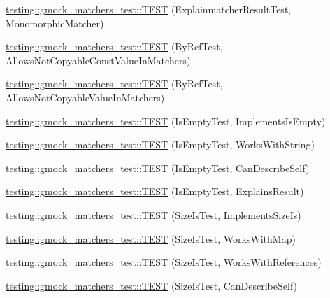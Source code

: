 \begin{DoxyCompactItemize}
\item 
\hyperlink{namespacetesting_1_1gmock__matchers__test_a102b10d9064f6e0037e3f3f0c3e76e22}{testing\+::gmock\+\_\+matchers\+\_\+test\+::\+T\+E\+ST} (Explainmatcher\+Result\+Test, Monomorphic\+Matcher)
\item 
\hyperlink{namespacetesting_1_1gmock__matchers__test_aab82f120c70dc7d8bc2fd74ac6897486}{testing\+::gmock\+\_\+matchers\+\_\+test\+::\+T\+E\+ST} (By\+Ref\+Test, Allows\+Not\+Copyable\+Const\+Value\+In\+Matchers)
\item 
\hyperlink{namespacetesting_1_1gmock__matchers__test_a5ed7b822889a34f018c2ba8f21941fd4}{testing\+::gmock\+\_\+matchers\+\_\+test\+::\+T\+E\+ST} (By\+Ref\+Test, Allows\+Not\+Copyable\+Value\+In\+Matchers)
\item 
\hyperlink{namespacetesting_1_1gmock__matchers__test_ab63796f77c7572f6f1aef01cb140f99e}{testing\+::gmock\+\_\+matchers\+\_\+test\+::\+T\+E\+ST} (Is\+Empty\+Test, Implements\+Is\+Empty)
\item 
\hyperlink{namespacetesting_1_1gmock__matchers__test_a22f0cacccee169b7390741b9815f4281}{testing\+::gmock\+\_\+matchers\+\_\+test\+::\+T\+E\+ST} (Is\+Empty\+Test, Works\+With\+String)
\item 
\hyperlink{namespacetesting_1_1gmock__matchers__test_adcf3743190f973f2773296d0772e8950}{testing\+::gmock\+\_\+matchers\+\_\+test\+::\+T\+E\+ST} (Is\+Empty\+Test, Can\+Describe\+Self)
\item 
\hyperlink{namespacetesting_1_1gmock__matchers__test_a1c168c284000d05d63bf5e9df10d1b7c}{testing\+::gmock\+\_\+matchers\+\_\+test\+::\+T\+E\+ST} (Is\+Empty\+Test, Explains\+Result)
\item 
\hyperlink{namespacetesting_1_1gmock__matchers__test_abe619d5d1910e1f2e8b169622d1d8592}{testing\+::gmock\+\_\+matchers\+\_\+test\+::\+T\+E\+ST} (Size\+Is\+Test, Implements\+Size\+Is)
\item 
\hyperlink{namespacetesting_1_1gmock__matchers__test_aea77169d6c56b88b5c99273d5a2bc0f2}{testing\+::gmock\+\_\+matchers\+\_\+test\+::\+T\+E\+ST} (Size\+Is\+Test, Works\+With\+Map)
\item 
\hyperlink{namespacetesting_1_1gmock__matchers__test_a53bcd375786f69d889a8e8891ff8e0b0}{testing\+::gmock\+\_\+matchers\+\_\+test\+::\+T\+E\+ST} (Size\+Is\+Test, Works\+With\+References)
\item 
\hyperlink{namespacetesting_1_1gmock__matchers__test_adc9720306de1626aa7e523637ca64dfa}{testing\+::gmock\+\_\+matchers\+\_\+test\+::\+T\+E\+ST} (Size\+Is\+Test, Can\+Describe\+Self)
\item 

\end{DoxyCompactItemize}
